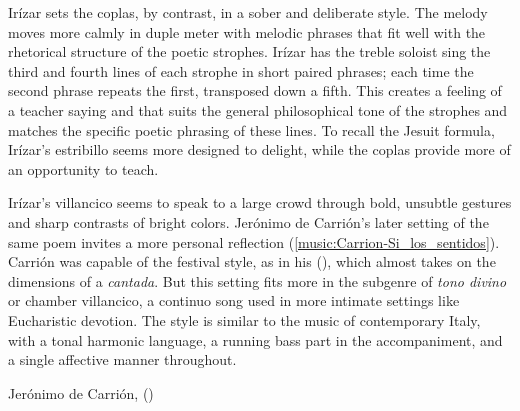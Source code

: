 Irízar sets the coplas, by contrast, in a sober and deliberate style.
The melody moves more calmly in duple meter with melodic phrases that fit well
with the rhetorical structure of the poetic strophes.  
Irízar has the treble soloist sing the third and fourth lines of each strophe in
short paired phrases; each time the second phrase repeats the first, transposed
down a fifth.
This creates a feeling of a teacher saying  and
 that suits the general philosophical tone of the
strophes and matches the specific poetic phrasing of these lines.
To recall the Jesuit formula, Irízar's estribillo seems more designed to
delight, while the coplas provide more of an opportunity to teach.

Irízar's villancico seems to speak to a large crowd through bold, unsubtle
gestures and sharp contrasts of bright colors.
Jerónimo de Carrión's later setting of the same poem invites a more personal
reflection (\cref{music:Carrion-Si_los_sentidos}).%
    \Autocite[149--152]{Cashner:WLSCM32}
Carrión was capable of the festival style, as in his  (), which almost takes on the dimensions of a
\emph{cantada}.  
But this setting fits more in the subgenre of \emph{tono divino} or chamber
villancico, a continuo song used in more intimate settings like Eucharistic
devotion.%
    \Autocite[See, for example][]{Robledo:MadridTonos}
The style is similar to the  music of contemporary Italy,
with a tonal harmonic language, a running bass part in the accompaniment, and a
single affective manner throughout.

\begin{musicexample}
    \caption{Jerónimo de Carrión,  ()} %

    \label{music:Carrion-Si_los_sentidos}
\end{musicexample}

